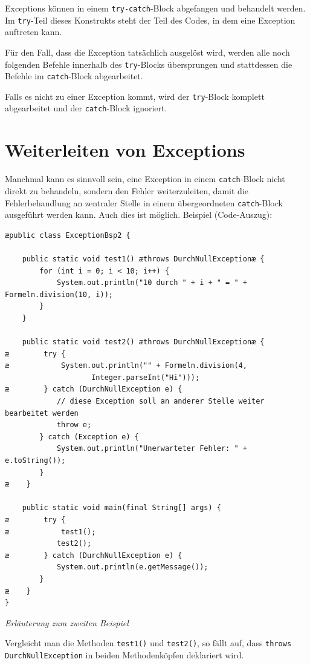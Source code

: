 \begin{compactenum}[a)]
Exceptions können in einem \lstinline|try-catch|-Block abgefangen und behandelt
werden. Im \lstinline|try|-Teil dieses Konstrukts steht der Teil des Codes, in
dem eine Exception auftreten kann.

Für den Fall, dass die Exception tatsächlich ausgelöst wird, werden alle
noch folgenden Befehle innerhalb des \lstinline|try|-Blocks übersprungen und
stattdessen die Befehle im \lstinline|catch|-Block abgearbeitet.

Falls es nicht zu einer Exception kommt, wird der \lstinline|try|-Block komplett
abgearbeitet und der \lstinline|catch|-Block ignoriert.
\end{compactenum}

\section{Weiterleiten von Exceptions}

Manchmal kann es sinnvoll sein, eine Exception in einem \lstinline|catch|-Block
nicht direkt zu behandeln, sondern den Fehler weiterzuleiten, damit die
Fehlerbehandlung an zentraler Stelle in einem übergeordneten
\lstinline|catch|-Block ausgeführt werden kann. Auch dies ist möglich. Beispiel
(Code-Auszug):

\begin{lstlisting}
æpublic class ExceptionBsp2 {

    public static void test1() æthrows DurchNullExceptionæ {
        for (int i = 0; i < 10; i++) {
            System.out.println("10 durch " + i + " = " + Formeln.division(10, i));
        }
    }

    public static void test2() æthrows DurchNullExceptionæ {
æ        try {
æ            System.out.println("" + Formeln.division(4,
                    Integer.parseInt("Hi"))); 
æ        } catch (DurchNullException e) {
            // diese Exception soll an anderer Stelle weiter bearbeitet werden
            throw e;
        } catch (Exception e) {
            System.out.println("Unerwarteter Fehler: " + e.toString());
        }
æ    }
    
    public static void main(final String[] args) {
æ        try {
æ            test1();
            test2();
æ        } catch (DurchNullException e) {
            System.out.println(e.getMessage());
        }
æ    }
}   
\end{lstlisting}

\emph{Erläuterung zum zweiten Beispiel}

Vergleicht man die Methoden \lstinline|test1()| und \lstinline|test2()|, so
fällt auf, dass \lstinline|throws DurchNullException| in beiden Methodenköpfen
deklariert wird.

